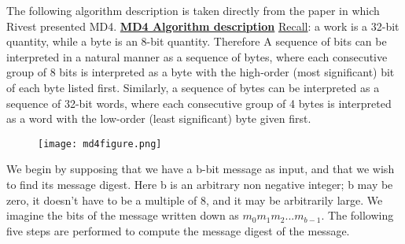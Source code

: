 \documentclass{article}
\begin{document}
The following algorithm description is taken directly from the paper in which Rivest presented MD4.
\newpage \underline{\textbf{MD4 Algorithm description}}
\newline\newline  \underline{Recall}: a work is a 32-bit quantity, while a byte is an 8-bit quantity. Therefore A sequence of bits  can be interpreted in a  natural manner as a  sequence of bytes, where each consecutive group of 8 bits is interpreted as a byte with the high-order (most significant) bit of each byte listed first. Similarly, a sequence of bytes  can be interpreted as a sequence of 32-bit words,  where  each consecutive group of 4 bytes is  interpreted as a word with the low-order (least significant) byte given first. 
\begin{figure} [H]
    \centering
    \texttt{[image: md4figure.png]}
\end{figure}
We begin by supposing that we have a b-bit message as input, and that we wish to find its message digest. Here b is an  arbitrary non negative  integer; b may be zero, it doesn't have to be a multiple of 8, and it may  be arbitrarily large. We imagine the bits of the message written down as $m_0m_1m_2...m_{b-1}$.
The following five steps are performed to compute the message digest of the message. 
\end{document}
